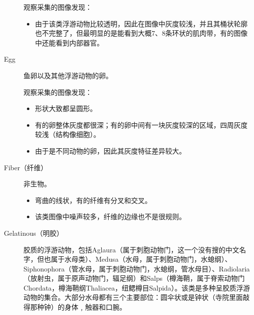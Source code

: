 \begin{description}
    观察采集的图像发现：
        \begin{itemize}
        \item 由于该类浮游动物比较透明，因此在图像中灰度较浅，并且其桶状轮廓也不完整了，但最明显的是能看到大概7、8条环状的肌肉带，有的图像中还能看到内部器官。
        \end{itemize}
    \item[{\color{blue}Egg}] 鱼卵以及其他浮游动物的卵。
    
    观察采集的图像发现：
        \begin{itemize}
        \item 形状大致都呈圆形。
        \item 有的卵整体灰度都很深；有的卵中间有一块灰度较深的区域，四周灰度较浅（结构像细胞）。
        \item {\color{blue}由于是不同动物的卵，因此其灰度特征差异较大}。
        \end{itemize}
    \item[Fiber（纤维）] 非生物。
        \begin{itemize}
        \item 弯曲的线状，有的纤维有分叉和交叉。
        \item 该类图像中噪声较多，纤维的边缘也不是很规则。
        \end{itemize}
    \item[Gelatinous（明胶）] 胶质的浮游动物，包括Aglaura（属于刺胞动物门，这一个没有搜的中文名字，但也属于水母类）、Medusa（水母，属于刺胞动物门，水螅纲）、Siphonophora（管水母，属于刺胞动物门，水螅纲，管水母目）、Radiolaria（放射虫，属于原声动物门，辐足纲）和Salps（樽海鞘，属于脊索动物门Chordata，樽海鞘纲Thaliacea，纽鳃樽目Salpida）。该类是多种呈胶质浮游动物的集合。大部分水母都有三个主要部位：圆伞状或是钟状（寺院里面敲得那种钟）的身体﹐触器和口腕。
    

\end{description}
